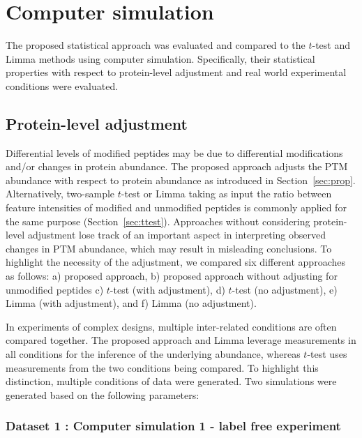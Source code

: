 \documentclass{mcp}
\def\secref#1{Section~\ref{#1}}
\begin{document}
\clearpage
\section{Computer simulation}
\label{sec:sim}

The proposed statistical approach was evaluated and compared to the $t$-test and Limma methods using computer simulation. Specifically, their statistical properties with respect to protein-level adjustment and real world experimental conditions were evaluated.


\subsection{Protein-level adjustment}

Differential levels of modified peptides may be due to differential modifications and/or changes in protein abundance. The proposed approach adjusts the PTM abundance with respect to protein abundance as introduced in \secref{sec:prop}. Alternatively, two-sample $t$-test or Limma taking as input the ratio between feature intensities of modified and unmodified peptides is commonly applied for the same purpose (\secref{sec:ttest}). 
Approaches without considering protein-level adjustment lose track of an important aspect in interpreting observed changes in PTM abundance, which may result in misleading conclusions. To highlight the necessity of the adjustment, we compared six different approaches as follows: a) proposed approach, b) proposed approach without adjusting for unmodified peptides c) $t$-test (with adjustment), d) $t$-test (no adjustment), e) Limma (with adjustment), and f) Limma (no adjustment).

In experiments of complex designs, multiple inter-related conditions are often compared together. The proposed approach and Limma leverage measurements in all conditions for the inference of the underlying abundance, whereas $t$-test uses measurements from the two conditions being compared. To highlight this distinction, multiple conditions of data were generated. Two simulations were generated based on the following parameters: 

\subsubsection{Dataset 1 : Computer simulation 1 - label free experiment}
\end{document}
